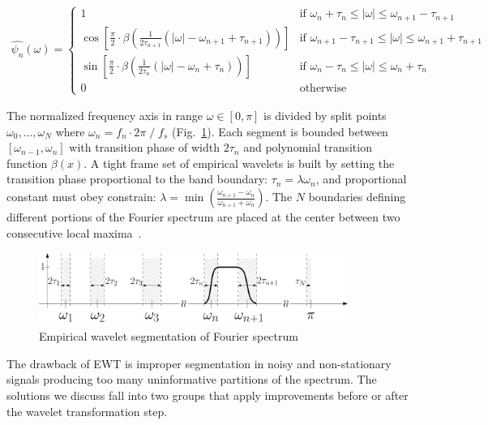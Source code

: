 \begin{ceqn}\begin{align}
\hat{\psi_n}(\omega) = 
\begin{cases}
1       & \text{if } \omega_n + \tau_n \leq |\omega| \leq \omega_{n+1} - \tau_{n+1} \\
\cos\left[\frac{\pi}{2}\cdot \beta\left(\frac{1}{2\tau_{n+1}}(|\omega| - \omega_{n+1} + \tau_{n+1})\right)\right] & \text{if } \omega_{n+1} - \tau_{n+1} \leq |\omega| \leq \omega_{n+1} + \tau_{n+1} \\
\sin\left[\frac{\pi}{2}\cdot \beta\left(\frac{1}{2\tau_n}(|\omega| - \omega_n + \tau_n)\right)\right] & \text{if }\omega_n - \tau_n \leq |\omega| \leq \omega_{n} + \tau_{n} \\
0       & \text{otherwise }
\end{cases}
\label{equ:ewt-wavelet}
\end{align}\end{ceqn}

The normalized frequency axis in range $\omega \in [0, \pi]$ is divided by split points $\omega_0, \dots, \omega_N$ where $\omega_n = f_n \cdot 2 \pi\;/\;f_s$ (Fig.~\ref{fig:ewt-spectrum-segmentation}). Each segment is bounded between $[\omega_{n-1}, \omega_n]$ with transition phase of width $2\tau_n$ and polynomial transition function $\beta(x)$. A tight frame set of empirical wavelets is built by setting the transition phase proportional to the band boundary: $\tau_n = \lambda \omega_n$, and proportional constant must obey constrain: $\lambda = \min\left(\frac{\omega_{n+1} - \omega_n}{\omega_{n+1} + \omega_n}\right)$. The $N$ boundaries defining different portions of the Fourier spectrum are placed at the center between two consecutive local maxima~\cite{gilles_empirical_2013}.

\begin{figure}[ht]
    \centering
    \includegraphics[width=0.9\textwidth]{assets/EWT.png}
    \caption{Empirical wavelet segmentation of Fourier spectrum~\cite{gilles_empirical_2013}}
    \label{fig:ewt-spectrum-segmentation}
\end{figure}

The drawback of EWT is improper segmentation in noisy and non-stationary signals producing too many uninformative partitions of the spectrum. The solutions we discuss fall into two groups that apply improvements before or after the wavelet transformation step. 

